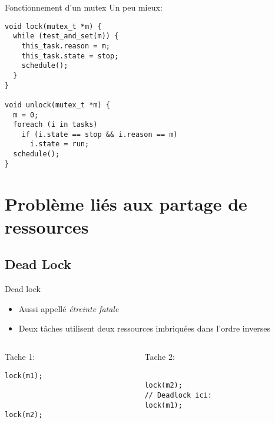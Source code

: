 \begin{frame}[fragile]{Fonctionnement d'un mutex}
  Un peu mieux:
  \begin{lstlisting} 
void lock(mutex_t *m) {
  while (test_and_set(m)) {
    this_task.reason = m;
    this_task.state = stop;
    schedule();
  }
}

void unlock(mutex_t *m) {
  m = 0;
  foreach (i in tasks)
    if (i.state == stop && i.reason == m)
      i.state = run;
  schedule();
}
  \end{lstlisting}
\end{frame} 

\section{Problème liés aux partage de ressources}

\subsection{Dead Lock}

\begin{frame}[fragile]{Dead lock}
  \begin{itemize} 
  \item Aussi appellé \emph{étreinte fatale}
  \item Deux tâches utilisent  deux ressources imbriquées dans l'ordre
    inverses
  \end{itemize} 
  \begin{columns}
    \begin{column}{5cm}
      Tache 1:
      \begin{lstlisting}[showlines=true,emptylines=10]
lock(m1);



lock(m2);
      \end{lstlisting} 
    \end{column}
    \begin{column}{5cm}
      Tache 2:
      \begin{lstlisting}[showlines=true,emptylines=10]

lock(m2);
// Deadlock ici:
lock(m1);

      \end{lstlisting} 
    \end{column}
  \end{columns}
\begin{center}
\end{center}
\end{frame} 

